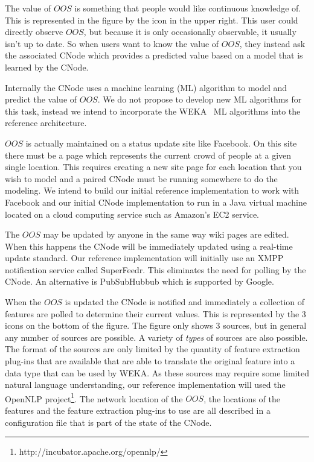 The value of $OOS$ is something that people would like continuous knowledge of.
This is represented in the figure by the icon in the upper right.  This user
could directly observe $OOS$, but because it is only occasionally observable, it
usually isn't up to date. So when users want to know the value of $OOS$, they
instead ask the associated CNode which provides a predicted value based on
a model that is learned by the CNode. 

Internally the CNode uses a machine learning (ML) algorithm to model and predict the
value of $OOS$.  We do not propose to develop new ML algorithms for this task,
instead we intend to incorporate the WEKA~\cite{Hall2009} ML algorithms into the
reference architecture.

$OOS$ is actually maintained on a status update site like Facebook.  On this
site there must be a page which represents the current crowd of people at a given
single location.  This requires creating a new site page for each location that
you wish to model and a paired CNode must be running somewhere to do the
modeling.  We intend to build our initial reference implementation to work with
Facebook and our initial CNode implementation to run in a Java virtual machine
located on a cloud computing service such as Amazon's EC2 service.  

The $OOS$
may be updated by anyone in the same way wiki pages are edited.  When this
happens the CNode will be immediately updated using a real-time update
standard.  Our reference implementation will initially use an XMPP notification
service called SuperFeedr.  This eliminates the need for polling by the CNode.
An alternative is PubSubHubbub which is supported by Google.

When the $OOS$ is updated the CNode is notified and immediately a collection of
features are polled to determine their current values.  This is represented by
the 3 icons on the bottom of the figure.  The figure only shows 3 sources, but
in general any number of sources are possible.  A variety of \emph{types} of sources
are also possible.  The format of the sources are only limited by the quantity
of feature extraction plug-ins that are available that are able to translate the
original feature into a data type that can be used by WEKA.  As these sources
may require some limited natural language understanding, our reference
implementation will used the OpenNLP
project\footnote{http://incubator.apache.org/opennlp/}.  The network location of
the $OOS$, the locations of the features and the feature extraction plug-ins to
use are all described in a configuration file that is part of the state of the
CNode.


